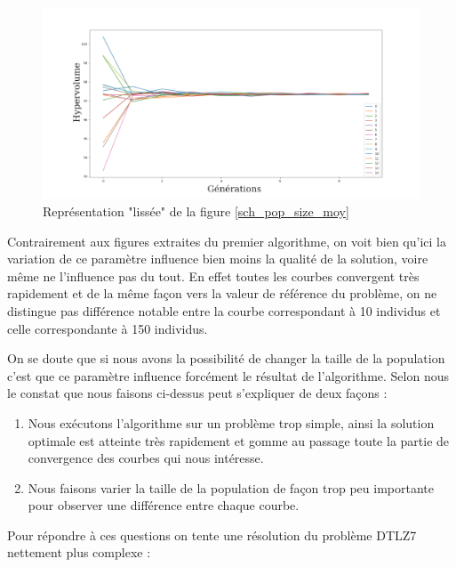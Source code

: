 \documentclass[12pt]{report}
\begin{document}
      \begin{figure}[!]
        \centering
        \includegraphics[width=18cm]{img/pop_size_sch_liss.png}
        \caption{Représentation "lissée" de la figure \ref{sch_pop_size_moy}}
        \label{sch_pop_size_liss}
      \end{figure}


      Contrairement aux figures extraites du premier algorithme, on voit bien qu'ici la variation de ce paramètre influence bien moins la qualité de la solution, voire même ne l'influence pas du tout. En effet toutes les courbes convergent très rapidement et de la même façon vers la valeur de référence du problème, on ne distingue pas différence notable entre la courbe correspondant à 10 individus et celle correspondante à 150 individus.

      On se doute que si nous avons la possibilité de changer la taille de la population c'est que ce paramètre influence forcément le résultat de l'algorithme. Selon nous le constat que nous faisons ci-dessus peut s'expliquer de deux façons :
      \begin{enumerate}
        \item Nous exécutons l'algorithme sur un problème trop simple, ainsi la solution optimale est atteinte très rapidement et gomme au passage toute la partie de convergence des courbes qui nous intéresse.
        \item Nous faisons varier la taille de la population de façon trop peu importante pour observer une différence entre chaque courbe.
      \end{enumerate}

      Pour répondre à ces questions on tente une résolution du problème DTLZ7 nettement plus complexe :
\end{document}
